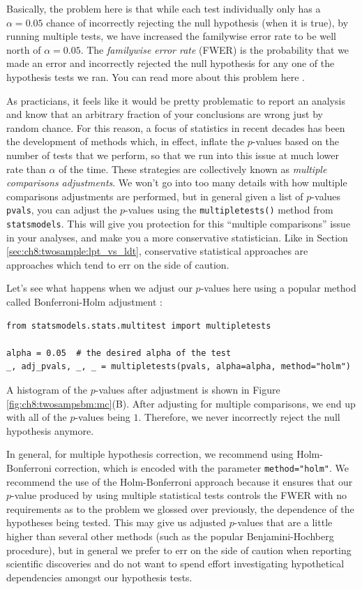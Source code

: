 Basically, the problem here is that while each test individually only has a $\alpha = 0.05$ chance of incorrectly rejecting the null hypothesis (when it is true), by running multiple tests, we have increased the familywise error rate to be well north of $\alpha = 0.05$. The \textit{familywise error rate} (FWER) is the probability that we made an error and incorrectly rejected the null hypothesis for any one of the hypothesis tests we ran. You can read more about this problem here \cite{Ryan1959Jan}.

As practicians, it feels like it would be pretty problematic to report an analysis and know that an arbitrary fraction of your conclusions are wrong just by random chance. For this reason, a focus of statistics in recent decades has been the development of methods which, in effect, inflate the $p$-values based on the number of tests that we perform, so that we run into this issue at much lower rate than $\alpha$ of the time. These strategies are collectively known as \textit{multiple comparisons adjustments}. We won't go into too many details with how multiple comparisons adjustments are performed, but in general given a list of $p$-values \texttt{pvals}, you can adjust the $p$-values using the \texttt{multipletests()} method from \texttt{statsmodels}. This will give you protection for this ``multiple comparisons'' issue in your analyses, and make you a more conservative statistician. Like in Section \ref{sec:ch8:twosample:lpt_vs_ldt}, conservative statistical approaches are approaches which tend to err on the side of caution.

Let's see what happens when we adjust our $p$-values here using a popular method called Bonferroni-Holm adjustment \cite{Holm1979}:
\begin{lstlisting}[style=python]
from statsmodels.stats.multitest import multipletests

alpha = 0.05  # the desired alpha of the test
_, adj_pvals, _, _ = multipletests(pvals, alpha=alpha, method="holm")
\end{lstlisting}

A histogram of the $p$-values after adjustment is shown in Figure \ref{fig:ch8:twosampsbm:mc}(B). After adjusting for multiple comparisons, we end up with all of the $p$-values being $1$. Therefore, we never incorrectly reject the null hypothesis anymore.

In general, for multiple hypothesis correction, we recommend using Holm-Bonferroni correction, which is encoded with the parameter \texttt{method="holm"}. We recommend the use of the Holm-Bonferroni approach because it ensures that our $p$-value produced by using multiple statistical tests controls the FWER with no requirements as to the problem we glossed over previously, the dependence of the hypotheses being tested. This may give us adjusted $p$-values that are a little higher than several other methods (such as the popular Benjamini-Hochberg procedure), but in general we prefer to err on the side of caution when reporting scientific discoveries and do not want to spend effort investigating hypothetical dependencies amongst our hypothesis tests.

